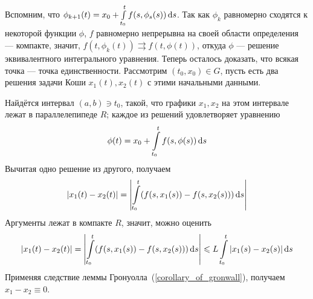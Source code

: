 \documentclass[a4paper]{report}
\begin{document}
{{        Вспомним, что $\phi_{k + 1}(t) = x_0 + \int\limits_{t_0}^{t}f(s, \phi_s(s))\operatorname{d}\! s$.
        Так как $\phi_k$ равномерно сходятся к некоторой функции $\phi$, $f$ равномерно непрерывна на своей области определения --- компакте, значит, $f(t, \phi_k(t)) \rightrightarrows f(t, \phi(t))$, откуда $\phi$ --- решение эквивалентного интегрального уравнения.
        \ok
        Теперь осталось доказать, что всякая точка --- точка единственности.
        Рассмотрим $(t_0, x_0) \in G$, пусть есть два решения задачи Коши $x_1(t), x_2(t)$ с этими начальными данными.

        Найдётся интервал $(a, b) \ni t_0$, такой, что графики $x_1, x_2$ на этом интервале лежат в параллелепипеде $R$; каждое из решений удовлетворяет уравнению
        \[\phi(t) = x_0 + \int\limits_{t_0}^{t}f(s, \phi(s))\operatorname{d}\! s\]
        Вычитая одно решение из другого, получаем
        \[|x_1(t) - x_2(t)| = \left|\int\limits_{t_0}^{t}(f(s, x_1(s)) - f(s, x_2(s)))\operatorname{d}\! s\right|\]
        Аргументы лежат в компакте $R$, значит, можно оценить
        \[|x_1(t) - x_2(t)| = \left|\int\limits_{t_0}^{t}(f(s, x_1(s)) - f(s, x_2(s)))\operatorname{d}\! s\right| \leqslant L\int\limits_{t_0}^{t}|x_1(s) - x_2(s)|\operatorname{d}\! s\]
        Применяя следствие леммы Гронуолла~(\cref{corollary_of_gronwall}), получаем $x_1 - x_2 \equiv 0$.
    }
    }
\end{document}
